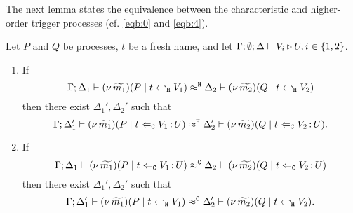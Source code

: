 

The next lemma states the equivalence between the characteristic
and higher-order trigger processes (cf. \eqref{eqb:0} and \eqref{eqb:4}).

\begin{lemma}
	\label{lem:trigger_equiv}
	Let $P$ and $Q$ be processes, $t$ be a fresh name, and
	let $\Gamma; \emptyset; \Delta \vdash V_i \triangleright U, i \in \{1, 2\}$.

	\begin{enumerate}[1)]
		\item	If
				\[
					\Gamma; \Delta_1 \vdash (\nu\, \widetilde{m_1})(P \;|\; t \hookleftarrow_{\mathtt{H}} V_1) \approx^\mathtt{H} \Delta_2 \vdash (\nu\, \widetilde{m_2})(Q \;|\; t \hookleftarrow_{\mathtt{H}} V_2 )
				\]
				then there exist $\Delta_1', \Delta_2'$ such that 
				\[
					\Gamma; \Delta_1' \vdash (\nu\, \widetilde{m_1})(P \;|\; t \Leftarrow_{\mathtt{C}} V_1{\,:\,}U) \approx^\mathtt{H} \Delta_2' \vdash (\nu\, \widetilde{m_2})(Q \;|\; t \Leftarrow_{\mathtt{C}} V_2{\,:\,}U).
				\]

		\item	If
				\[
					\Gamma; \Delta_1 \vdash (\nu\, \widetilde{m_1})(P \;|\; t \Leftarrow_{\mathtt{C}} V_1{\,:\,}U) \approx^\mathtt{C} \Delta_2 \vdash (\nu\, \widetilde{m_2})(Q \;|\; t \Leftarrow_{\mathtt{C}} V_2{\,:\,}U)
				\]
				then there exist $\Delta_1', \Delta_2'$ such that
				\[
					\Gamma; \Delta_1' \vdash (\nu\, \widetilde{m_1})(P \;|\; t \hookleftarrow_{\mathtt{H}} V_1) \approx^\mathtt{C} \Delta_2' \vdash (\nu\, \widetilde{m_2})(Q \;|\; t \hookleftarrow_{\mathtt{H}} V_2 ).
				\]
	\end{enumerate}
\end{lemma}

